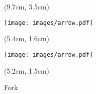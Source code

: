 \documentclass[aspectratio=169]{beamer}
\begin{document}
\begin{frame}{}
  \begin{textblock*}{5cm}(9.7cm, 3.5cm)
    \begin{center}
      \texttt{[image: images/arrow.pdf]}
    \end{center}
  \end{textblock*}
  
  \begin{textblock*}{5cm}(5.4cm, 1.6cm)
    \begin{center}
      \texttt{[image: images/arrow.pdf]}
    \end{center}
  \end{textblock*}
  
  \begin{textblock*}{5cm}(5.2cm, 1.5cm)
    \begin{center}
      {\small Fork}
    \end{center}
  \end{textblock*}

\end{frame}
\end{document}
